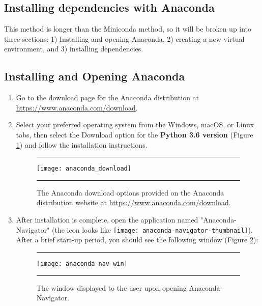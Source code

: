 \subsection{Installing dependencies with Anaconda}
This method is longer than the Miniconda method, so it will be broken up into three sections: 1) Installing and opening Anaconda, 2) creating a new virtual environment, and 3) installing dependencies.

\subsection*{Installing and Opening Anaconda}

\begin{enumerate}
    \item Go to the download page for the Anaconda distribution at \\ \url{https://www.anaconda.com/download}. 
    \item Select your preferred operating system from the Windows, macOS, or Linux tabs, then select the Download option for the \textbf{Python 3.6 version} (Figure \ref{anaconda_download}) and follow the installation instructions.

\begin{figure}[hbtp]
    \begin{maxipage}
    \hrule
    \centering
    \texttt{[image: anaconda\_download]}
    \caption{The Anaconda download options provided on the Anaconda distribution website at \protect \url{https://www.anaconda.com/download}.}
    \label{anaconda_download}
    \hrule
    \end{maxipage}
\end{figure}


    \item After installation is complete, open the application named "Anaconda-Navigator" (the icon looks like \texttt{[image: anaconda-navigator-thumbnail]}). After a brief start-up period, you should see the following window (Figure \ref{anaconda-nav-win}):
    
\begin{figure}[hbtp]
    \begin{maxipage}
    \hrule
    \centering
    \texttt{[image: anaconda-nav-win]}
    \caption{The window displayed to the user upon opening Anaconda-Navigator.}
    \label{anaconda-nav-win}
    \hrule
    \end{maxipage}
\end{figure}
    
    
\end{enumerate}

